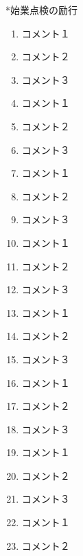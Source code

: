 \documentclass[11pt]{ltjsarticle}
\makeatletter
\renewcommand{\subsubsection}{%
    \@ifstar{\customsubsubsectionstar}{\customsubsubsection}} %
\newcommand{\customsubsubsection}[1]{%
    \leftskip = 0pt%
    \refstepcounter{subsubsection}%
    \noindent{\normalsize\bfseries \alph{subsubsection}. #1}%
    \par\nobreak\vspace{0.5ex}%
    \leftskip = 2em%
}
\newcommand{\customsubsubsectionstar}[1]{%
    \leftskip = 0pt%
    \noindent{\normalsize\bfseries $\blacksquare$ \hspace{0em} #1}%
    \par\nobreak\vspace{0.5ex}%
    \leftskip = 1.5em%
}
\makeatother
\begin{document}
\subsubsection*{始業点検の励行}
\begin{enumerate}
    \item コメント１
    \item コメント２
    \item コメント３
    \item コメント１
    \item コメント２
    \item コメント３
    \item コメント１
    \item コメント２
    \item コメント３
    \item コメント１
    \item コメント２
    \item コメント３
    \item コメント１
    \item コメント２
    \item コメント３
    \item コメント１
    \item コメント２
    \item コメント３
    \item コメント１
    \item コメント２
    \item コメント３
    \item コメント１
    \item コメント２
\end{enumerate}



\newpage
\end{document}

